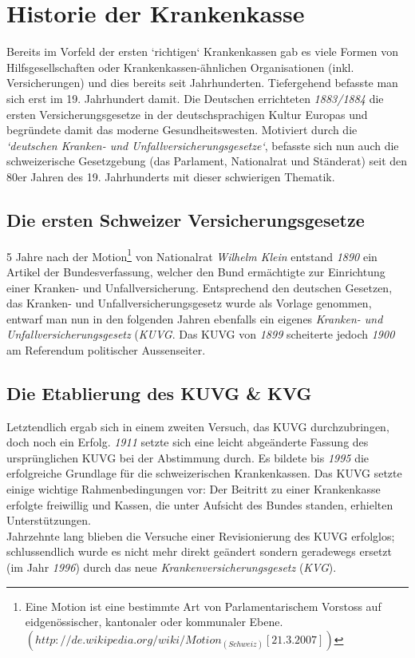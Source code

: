 \documentclass[a4paper,12pt]{book}
\begin{document}
\section{Historie der Krankenkasse}
Bereits im Vorfeld der ersten `richtigen` Krankenkassen gab es viele Formen von Hilfsgesellschaften oder Krankenkassen-ähnlichen Organisationen (inkl. Versicherungen) und dies bereits seit Jahrhunderten. Tiefergehend befasste man sich erst im 19. Jahrhundert damit. Die Deutschen errichteten \emph{1883/1884} die ersten Versicherungsgesetze in der deutschsprachigen Kultur Europas und begründete damit das moderne Gesundheitswesten. Motiviert durch die \emph{`deutschen Kranken- und Unfallversicherungsgesetze`}, befasste sich nun auch die schweizerische Gesetzgebung (das Parlament, Nationalrat und Ständerat) seit den 80er Jahren des 19. Jahrhunderts mit dieser schwierigen Thematik.\\

\subsection{Die ersten Schweizer Versicherungsgesetze}
5 Jahre nach der Motion\footnote{Eine Motion ist eine bestimmte Art von Parlamentarischem Vorstoss auf eidgenössischer, kantonaler oder kommunaler Ebene. $(http://de.wikipedia.org/wiki/Motion_(Schweiz) [21.3.2007])$} von Nationalrat \emph{Wilhelm Klein} entstand \emph{1890} ein Artikel der Bundesverfassung, welcher den Bund ermächtigte zur Einrichtung einer Kranken- und Unfallversicherung. Entsprechend den deutschen Gesetzen, das Kranken- und Unfallversicherungsgesetz wurde als Vorlage genommen, entwarf man nun in den folgenden Jahren ebenfalls ein eigenes \emph{Kranken- und Unfallversicherungsgesetz} (\emph{KUVG}. Das KUVG von \emph{1899} scheiterte jedoch \emph{1900} am  Referendum politischer Aussenseiter.\\

\subsection{Die Etablierung des KUVG \& KVG}
Letztendlich ergab sich in einem zweiten Versuch, das KUVG durchzubringen, doch noch ein Erfolg. \emph{1911} setzte sich eine leicht abgeänderte Fassung des ursprünglichen KUVG bei der Abstimmung durch. Es bildete bis \emph{1995} die erfolgreiche Grundlage für die schweizerischen Krankenkassen. Das KUVG setzte einige wichtige Rahmenbedingungen vor: Der Beitritt zu einer Krankenkasse erfolgte freiwillig und Kassen, die unter Aufsicht des Bundes standen, erhielten Unterstützungen.\\
Jahrzehnte lang blieben die Versuche einer Revisionierung des KUVG erfolglos; schlussendlich wurde es nicht mehr direkt geändert sondern geradewegs ersetzt (im Jahr \emph{1996}) durch das neue \emph{Krankenversicherungsgesetz} (\emph{KVG}).\\
\end{document}
